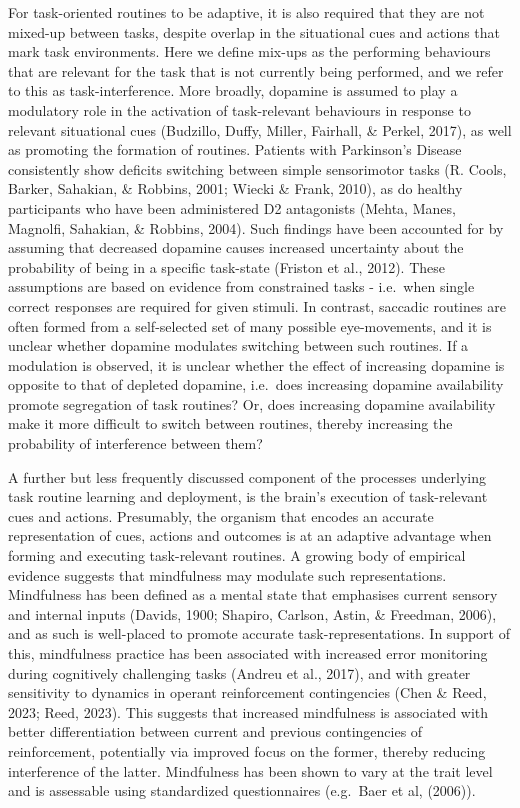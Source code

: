\documentclass[
  man]{apa6}
\begin{document}
For task-oriented routines to be adaptive, it is also required that they are not mixed-up between tasks, despite overlap in the situational cues and actions that mark task environments. Here we define mix-ups as the performing behaviours that are relevant for the task that is not currently being performed, and we refer to this as task-interference. More broadly, dopamine is assumed to play a modulatory role in the activation of task-relevant behaviours in response to relevant situational cues (Budzillo, Duffy, Miller, Fairhall, \& Perkel, 2017), as well as promoting the formation of routines. Patients with Parkinson's Disease consistently show deficits switching between simple sensorimotor tasks (R. Cools, Barker, Sahakian, \& Robbins, 2001; Wiecki \& Frank, 2010), as do healthy participants who have been administered D2 antagonists (Mehta, Manes, Magnolfi, Sahakian, \& Robbins, 2004). Such findings have been accounted for by assuming that decreased dopamine causes increased uncertainty about the probability of being in a specific task-state (Friston et al., 2012). These assumptions are based on evidence from constrained tasks - i.e.~when single correct responses are required for given stimuli. In contrast, saccadic routines are often formed from a self-selected set of many possible eye-movements, and it is unclear whether dopamine modulates switching between such routines. If a modulation is observed, it is unclear whether the effect of increasing dopamine is opposite to that of depleted dopamine, i.e.~does increasing dopamine availability promote segregation of task routines? Or, does increasing dopamine availability make it more difficult to switch between routines, thereby increasing the probability of interference between them?

A further but less frequently discussed component of the processes underlying task routine learning and deployment, is the brain's execution of task-relevant cues and actions. Presumably, the organism that encodes an accurate representation of cues, actions and outcomes is at an adaptive advantage when forming and executing task-relevant routines. A growing body of empirical evidence suggests that mindfulness may modulate such representations. Mindfulness has been defined as a mental state that emphasises current sensory and internal inputs (Davids, 1900; Shapiro, Carlson, Astin, \& Freedman, 2006), and as such is well-placed to promote accurate task-representations. In support of this, mindfulness practice has been associated with increased error monitoring during cognitively challenging tasks (Andreu et al., 2017), and with greater sensitivity to dynamics in operant reinforcement contingencies (Chen \& Reed, 2023; Reed, 2023). This suggests that increased mindfulness is associated with better differentiation between current and previous contingencies of reinforcement, potentially via improved focus on the former, thereby reducing interference of the latter. Mindfulness has been shown to vary at the trait level and is assessable using standardized questionnaires (e.g.~Baer et al, (2006)).
\end{document}
